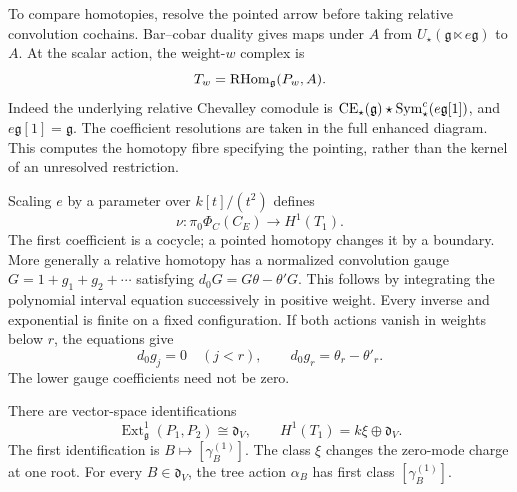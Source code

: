 To compare homotopies, resolve the pointed arrow before taking
relative convolution cochains. Bar--cobar duality gives maps
under $A$ from $U_\star(\mathfrak g\ltimes e\mathfrak g)$ to
$A$. At the scalar action, the weight-$w$ complex is
\begin{equation}\label{eq:vol2-action-tangent}
 T_w=\operatorname{RHom}_{\mathfrak g}(P_w,A).
\end{equation}
Indeed the underlying relative Chevalley comodule is
$\operatorname{CE}_{\star}(\mathfrak g)\star\operatorname{Sym}^c_
 \star(e\mathfrak g[1])$, and $e\mathfrak g[1]=\mathfrak g$.
The coefficient resolutions are taken in the full enhanced
diagram. This computes the homotopy fibre specifying the
pointing, rather than the kernel of an unresolved restriction.

Scaling $e$ by a parameter over $k[t]/(t^2)$ defines
\[
 \nu:\pi_0\Phi_C(C_E)\longrightarrow H^1(T_1).
\]
The first coefficient is a cocycle; a pointed homotopy changes
it by a boundary. More generally a relative homotopy has a
normalized convolution gauge $G=1+g_1+g_2+\cdots$ satisfying
$d_0G=G\theta-\theta'G$. This follows by integrating the
polynomial interval equation successively in positive weight.
Every inverse and exponential is finite on a fixed
configuration. If both actions vanish in weights below $r$,
the equations give
\begin{equation}\label{eq:vol2-leading-gauge}
 d_0g_j=0\quad(j<r),\qquad
 d_0g_r=\theta_r-\theta'_r.
\end{equation}
The lower gauge coefficients need not be zero.

\begin{theorem}\label{thm:vol2-first-weight-classification}
There are vector-space identifications
\begin{equation}\label{eq:vol2-first-weight-classification}
 \operatorname{Ext}^1_{\mathfrak g}(P_1,P_2)
       \cong\mathfrak d_V,
 \qquad H^1(T_1)=k\xi\oplus\mathfrak d_V.
\end{equation}
The first identification is $B\mapsto[\gamma_B^{(1)}]$.
The class $\xi$ changes the zero-mode charge at one root.
For every $B\in\mathfrak d_V$, the tree action $\alpha_B$
has first class $[\gamma_B^{(1)}]$.
\end{theorem}

